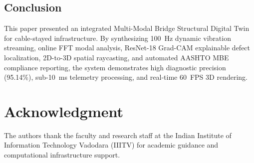 \documentclass[10pt, conference, letterpaper]{IEEEtran}
\begin{document}
\subsection{Conclusion}
This paper presented an integrated Multi-Modal Bridge Structural Digital Twin for cable-stayed infrastructure. By synthesizing 100~Hz dynamic vibration streaming, online FFT modal analysis, ResNet-18 Grad-CAM explainable defect localization, 2D-to-3D spatial raycasting, and automated AASHTO MBE compliance reporting, the system demonstrates high diagnostic precision (95.14\%), sub-10~ms telemetry processing, and real-time 60~FPS 3D rendering. 

\section*{Acknowledgment}
The authors thank the faculty and research staff at the Indian Institute of Information Technology Vadodara (IIITV) for academic guidance and computational infrastructure support.
\end{document}
